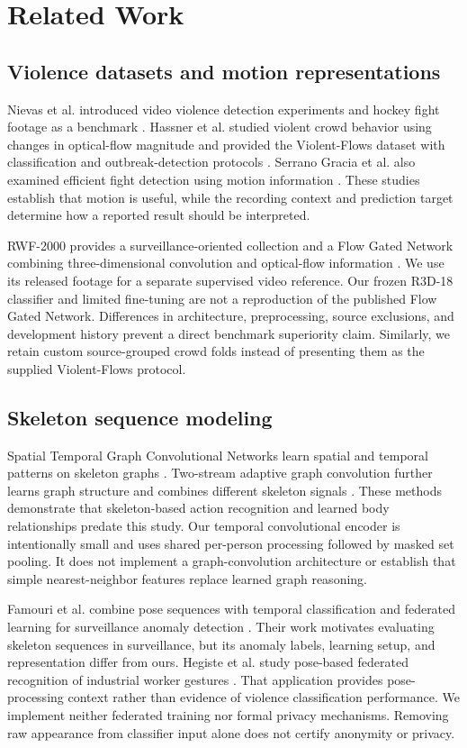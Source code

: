 \documentclass[journal]{IEEEtai}
\begin{document}
\section{Related Work}
\subsection{Violence datasets and motion representations}
Nievas et al. introduced video violence detection experiments and hockey fight footage as a benchmark \cite{nievas2011}. Hassner et al. studied violent crowd behavior using changes in optical-flow magnitude and provided the Violent-Flows dataset with classification and outbreak-detection protocols \cite{hassner2012}. Serrano Gracia et al. also examined efficient fight detection using motion information \cite{serrano2015}. These studies establish that motion is useful, while the recording context and prediction target determine how a reported result should be interpreted.

RWF-2000 provides a surveillance-oriented collection and a Flow Gated Network combining three-dimensional convolution and optical-flow information \cite{cheng2020}. We use its released footage for a separate supervised video reference. Our frozen R3D-18 classifier and limited fine-tuning are not a reproduction of the published Flow Gated Network. Differences in architecture, preprocessing, source exclusions, and development history prevent a direct benchmark superiority claim. Similarly, we retain custom source-grouped crowd folds instead of presenting them as the supplied Violent-Flows protocol.

\subsection{Skeleton sequence modeling}
Spatial Temporal Graph Convolutional Networks learn spatial and temporal patterns on skeleton graphs \cite{yan2018}. Two-stream adaptive graph convolution further learns graph structure and combines different skeleton signals \cite{shi2019}. These methods demonstrate that skeleton-based action recognition and learned body relationships predate this study. Our temporal convolutional encoder is intentionally small and uses shared per-person processing followed by masked set pooling. It does not implement a graph-convolution architecture or establish that simple nearest-neighbor features replace learned graph reasoning.

Famouri et al. combine pose sequences with temporal classification and federated learning for surveillance anomaly detection \cite{famouri2025}. Their work motivates evaluating skeleton sequences in surveillance, but its anomaly labels, learning setup, and representation differ from ours. Hegiste et al. study pose-based federated recognition of industrial worker gestures \cite{hegiste2025}. That application provides pose-processing context rather than evidence of violence classification performance. We implement neither federated training nor formal privacy mechanisms. Removing raw appearance from classifier input alone does not certify anonymity or privacy.
\end{document}
